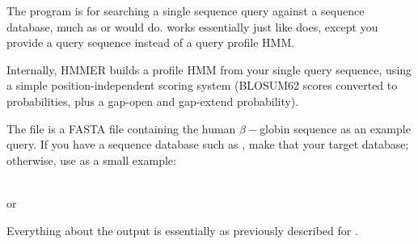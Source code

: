 The  program is for searching a single sequence query
against a sequence database, much as  or 
would do.  works essentially just like 
does, except you provide a query sequence instead of a query profile
HMM. 

Internally, HMMER builds a profile HMM from your single query
sequence, using a simple position-independent scoring system (BLOSUM62
scores converted to probabilities, plus a gap-open and gap-extend
probability).

The file  is a FASTA file containing the
human $\beta-$globin sequence as an example query. If you have a
sequence database such as , make that your
target database; otherwise, use  as a
small example:

\\
or\\

Everything about the output is essentially as previously described for
. 
















